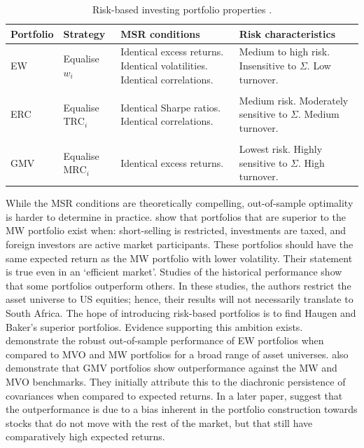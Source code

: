 \documentclass[a4paper,11pt,nocenter,bold,noupper,headcount]{mythesis}
\theoremstyle{plain}
\theoremstyle{definition}
\begin{document}
\begin{table} [h] 
\caption{Risk-based investing portfolio properties \citep{J13}.}
\label{tab_rb_port}
\centering
 \begin{tabular}{p{1.5cm} p{1.9cm} p{3.9cm}  p{4.4cm}  } 
\hline
\textbf{Portfolio} &  \textbf{Strategy} & \textbf{MSR conditions} & \textbf{Risk characteristics}\\ 
 \hline
EW & Equalise $w_i$ & Identical \newline excess returns. \newline Identical volatilities.  \newline Identical correlations. & Medium to high risk. \newline Insensitive to $\Sigma$. \newline Low turnover. \\
&&&\\
ERC & Equalise $\text{TRC}_i$ & Identical \newline Sharpe ratios. \newline Identical correlations. & Medium risk. \newline Moderately sensitive to $\Sigma$. \newline Medium  turnover. \\
&&&\\
GMV & Equalise $\text{MRC}_i$ & Identical \newline excess returns. & Lowest risk. \newline Highly sensitive to $\Sigma$. \newline High turnover.  \\
 \hline
\end{tabular}
\end{table}

While the MSR conditions are theoretically compelling, out-of-sample optimality is harder to determine in practice. \cite{H91} show that portfolios that are superior to the MW portfolio exist when: short-selling is restricted, investments are taxed, and foreign investors are active market participants. These portfolios should have the same expected return as the MW portfolio with lower volatility. Their statement is true even in an `efficient market'. Studies of the historical performance show that some portfolios outperform others. In these studies, the authors restrict the asset universe to US equities; hence, their results will not necessarily translate to South Africa. The hope of introducing risk-based portfolios is to find Haugen and Baker's superior portfolios. Evidence supporting this ambition exists. \cite{DGL07} demonstrate the robust out-of-sample performance of EW portfolios when compared to MVO and MW portfolios for a broad range of asset universes. \cite{C06} also demonstrate that GMV portfolios show outperformance against the MW and MVO benchmarks. They initially attribute this to the diachronic persistence of covariances when compared to expected returns. In a later paper, \cite{C11} suggest that the outperformance is due to a bias inherent in the portfolio construction towards stocks that do not move with the rest of the market, but that still have comparatively high expected returns.
\end{document}
